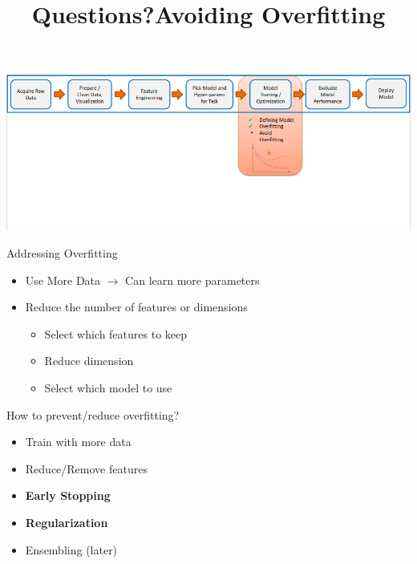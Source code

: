 \documentclass[aspectratio=169,14pt,usenames,dvipsnames]{beamer}
\begin{document}
{\1
\begin{frame}
	\title{Questions?}
	\maketitle
\end{frame}}


\begin{frame}

\includegraphics[width=1.0\textwidth, height=0.8\textheight]{Images/AIML_OFG_17.png}
\end{frame}


{\1
\begin{frame} \vspace{35pt}
	\title[Avoiding Overfitting]{Avoiding Overfitting}
	\maketitle
\end{frame}
}

\begin{frame}{Addressing Overfitting}
\begin{itemize}
\item Use More Data $\rightarrow$ Can learn more parameters
\item Reduce the number of features or dimensions
\begin{itemize}
\item Select which features to keep
\item Reduce dimension
\item Select which model to use
\end{itemize}
\end{itemize}
\end{frame}


\begin{frame}{How to prevent/reduce overfitting?}
\begin{itemize}
\item \alert{Train with more data}
\item \alert{Reduce/Remove features}
\item \textbf{Early Stopping}
\item \textbf{Regularization}
\item Ensembling (later)
\end{itemize}
\end{frame}
\end{document}
